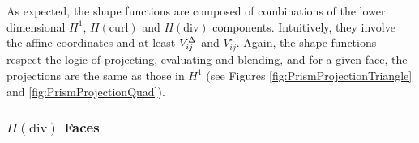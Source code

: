 As expected, the shape functions are composed of combinations of the lower dimensional $H^1$, $H(\mathrm{curl})$ and $H(\mathrm{div})$ components. 
Intuitively, they involve the affine coordinates and at least $V_{ij}^\Delta$ and $V_{ij}^\square$.
Again, the shape functions respect the logic of projecting, evaluating and blending, and for a given face, the projections are the same as those in $H^1$ (see Figures \ref{fig:PrismProjectionTriangle} and \ref{fig:PrismProjectionQuad}).





\subsubsection{\texorpdfstring{$H(\mathrm{div})$}{Hdiv} Faces}

